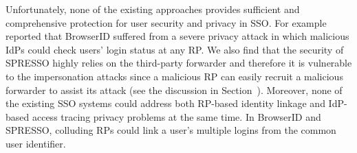 
Unfortunately, none of the existing approaches provides sufficient and comprehensive protection for user security and privacy in SSO. For example \cite{BrowserID} reported that BrowserID suffered from a severe privacy attack in which malicious IdPs could check users' login status at any RP. We also find that the security of SPRESSO highly relies on the third-party forwarder and therefore it is vulnerable to the impersonation attacks since a malicious RP can easily recruit a malicious forwarder to assist its attack (see the discussion in Section~). Moreover, none of the existing SSO systems could address both RP-based identity linkage and IdP-based access tracing privacy problems at the same time. In BrowserID and SPRESSO, colluding RPs could link a user's multiple logins from the common user identifier.


